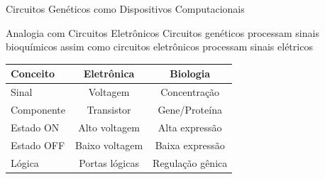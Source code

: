 \begin{frame}{Circuitos Genéticos como Dispositivos Computacionais}
\begin{block}{Analogia com Circuitos Eletrônicos}
Circuitos genéticos processam sinais bioquímicos assim como circuitos eletrônicos processam sinais elétricos
\end{block}

\vspace{0.3cm}

\begin{center}
\begin{tabular}{lcc}
\toprule
\textbf{Conceito} & \textbf{Eletrônica} & \textbf{Biologia} \\
\midrule
Sinal & Voltagem & Concentração \\
Componente & Transistor & Gene/Proteína \\
Estado ON & Alto voltagem & Alta expressão \\
Estado OFF & Baixo voltagem & Baixa expressão \\
Lógica & Portas lógicas & Regulação gênica \\
\bottomrule
\end{tabular}
\end{center}

\end{frame}

